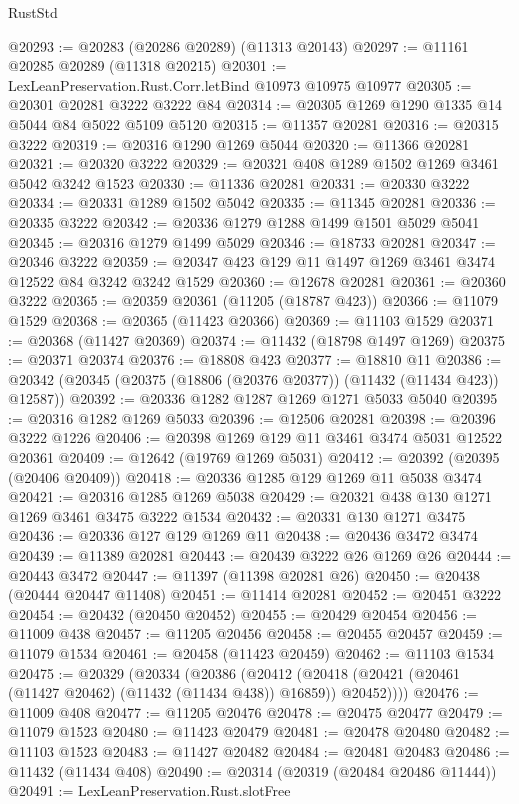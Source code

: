 \begin{lexlean}{RustStd}
\begin{coremodule}
@20293 := @20283 (@20286 @20289) (@11313 @20143)
@20297 := @11161 @20285 @20289 (@11318 @20215)
@20301 := LexLeanPreservation.Rust.Corr.letBind @10973 @10975 @10977
@20305 := @20301 @20281 @3222 @3222 @84
@20314 := @20305 @1269 @1290 @1335 @14 @5044 @84 @5022 @5109 @5120
@20315 := @11357 @20281
@20316 := @20315 @3222
@20319 := @20316 @1290 @1269 @5044
@20320 := @11366 @20281
@20321 := @20320 @3222
@20329 := @20321 @408 @1289 @1502 @1269 @3461 @5042 @3242 @1523
@20330 := @11336 @20281
@20331 := @20330 @3222
@20334 := @20331 @1289 @1502 @5042
@20335 := @11345 @20281
@20336 := @20335 @3222
@20342 := @20336 @1279 @1288 @1499 @1501 @5029 @5041
@20345 := @20316 @1279 @1499 @5029
@20346 := @18733 @20281
@20347 := @20346 @3222
@20359 := @20347 @423 @129 @11 @1497 @1269 @3461 @3474 @12522 @84 @3242 @3242 @1529
@20360 := @12678 @20281
@20361 := @20360 @3222
@20365 := @20359 @20361 (@11205 (@18787 @423))
@20366 := @11079 @1529
@20368 := @20365 (@11423 @20366)
@20369 := @11103 @1529
@20371 := @20368 (@11427 @20369)
@20374 := @11432 (@18798 @1497 @1269)
@20375 := @20371 @20374
@20376 := @18808 @423
@20377 := @18810 @11
@20386 := @20342 (@20345 (@20375 (@18806 (@20376 @20377)) (@11432 (@11434 @423)) @12587))
@20392 := @20336 @1282 @1287 @1269 @1271 @5033 @5040
@20395 := @20316 @1282 @1269 @5033
@20396 := @12506 @20281
@20398 := @20396 @3222 @1226
@20406 := @20398 @1269 @129 @11 @3461 @3474 @5031 @12522 @20361
@20409 := @12642 (@19769 @1269 @5031)
@20412 := @20392 (@20395 (@20406 @20409))
@20418 := @20336 @1285 @129 @1269 @11 @5038 @3474
@20421 := @20316 @1285 @1269 @5038
@20429 := @20321 @438 @130 @1271 @1269 @3461 @3475 @3222 @1534
@20432 := @20331 @130 @1271 @3475
@20436 := @20336 @127 @129 @1269 @11
@20438 := @20436 @3472 @3474
@20439 := @11389 @20281
@20443 := @20439 @3222 @26 @1269 @26
@20444 := @20443 @3472
@20447 := @11397 (@11398 @20281 @26)
@20450 := @20438 (@20444 @20447 @11408)
@20451 := @11414 @20281
@20452 := @20451 @3222
@20454 := @20432 (@20450 @20452)
@20455 := @20429 @20454
@20456 := @11009 @438
@20457 := @11205 @20456
@20458 := @20455 @20457
@20459 := @11079 @1534
@20461 := @20458 (@11423 @20459)
@20462 := @11103 @1534
@20475 := @20329
    (@20334
      (@20386
        (@20412 (@20418 (@20421 (@20461 (@11427 @20462) (@11432 (@11434 @438)) @16859)) @20452))))
@20476 := @11009 @408
@20477 := @11205 @20476
@20478 := @20475 @20477
@20479 := @11079 @1523
@20480 := @11423 @20479
@20481 := @20478 @20480
@20482 := @11103 @1523
@20483 := @11427 @20482
@20484 := @20481 @20483
@20486 := @11432 (@11434 @408)
@20490 := @20314 (@20319 (@20484 @20486 @11444))
@20491 := LexLeanPreservation.Rust.slotFree

\end{coremodule}
\end{lexlean}
